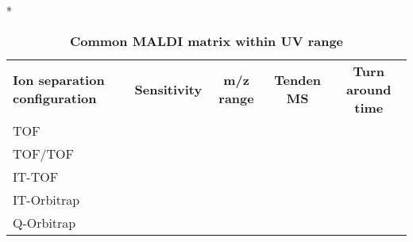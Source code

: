 \begin{table}{*}
\caption{\textbf{Common MALDI matrix within UV range}}
\label{tab:matrix}

\centering 
\scriptsize

\begin{tabular}{|l|c|c|c|c|}
    \hline 
    \textbf{Ion separation configuration} & \textbf{Sensitivity} & \textbf{m/z range} & \textbf{Tenden MS} & \textbf{Turn around time} \\
    TOF & \\
    TOF/TOF \\
    IT-TOF \\
    IT-Orbitrap \\
    Q-Orbitrap \\
    \hline \hline 
\end{tabular}
\end{table}